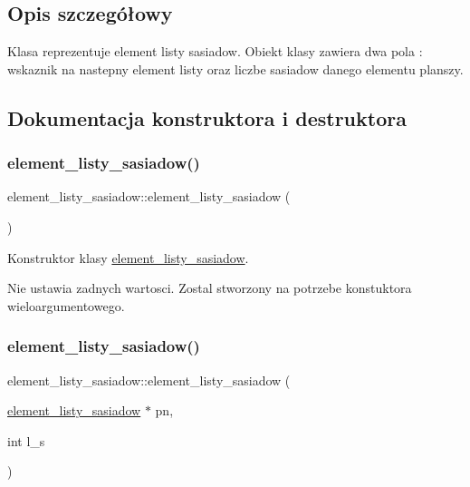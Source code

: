\subsection{Opis szczegółowy}
Klasa reprezentuje element listy sasiadow. Obiekt klasy zawiera dwa pola \+: wskaznik na nastepny element listy oraz liczbe sasiadow danego elementu planszy. 

\subsection{Dokumentacja konstruktora i destruktora}
\mbox{\label{classelement__listy__sasiadow_a600405f729beac4281f6c2c4e762dd94}} 
\subsubsection{\texorpdfstring{element\+\_\+listy\+\_\+sasiadow()}{element\_listy\_sasiadow()}\hspace{0.1cm}{\footnotesize\ttfamily [1/2]}}
{\footnotesize\ttfamily element\+\_\+listy\+\_\+sasiadow\+::element\+\_\+listy\+\_\+sasiadow (\begin{DoxyParamCaption}{ }\end{DoxyParamCaption})}

Konstruktor klasy \mbox{\hyperlink{classelement__listy__sasiadow}{element\+\_\+listy\+\_\+sasiadow}}.

Nie ustawia zadnych wartosci. Zostal stworzony na potrzebe konstuktora wieloargumentowego. \mbox{\label{classelement__listy__sasiadow_af6e34737050f2737637b2451ed26375d}} 
\subsubsection{\texorpdfstring{element\+\_\+listy\+\_\+sasiadow()}{element\_listy\_sasiadow()}\hspace{0.1cm}{\footnotesize\ttfamily [2/2]}}
{\footnotesize\ttfamily element\+\_\+listy\+\_\+sasiadow\+::element\+\_\+listy\+\_\+sasiadow (\begin{DoxyParamCaption}\item[{\mbox{\hyperlink{classelement__listy__sasiadow}{element\+\_\+listy\+\_\+sasiadow}} $\ast$}]{pn,  }\item[{int}]{l\+\_\+s }\end{DoxyParamCaption})}


